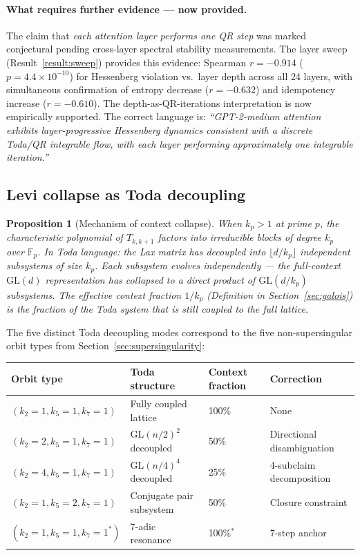\documentclass[11pt]{amsart}
\newtheorem{proposition}[theorem]{Proposition}
\theoremstyle{definition}
\begin{document}
\paragraph{What requires further evidence — now provided.}
The claim that \emph{each attention layer performs one QR step} was
marked conjectural pending cross-layer spectral stability measurements.
The layer sweep (Result~\ref{result:sweep}) provides this evidence:
Spearman $r = -0.914$ ($p = 4.4\times10^{-10}$) for Hessenberg violation
vs.\ layer depth across all 24 layers, with simultaneous confirmation of
entropy decrease ($r=-0.632$) and idempotency increase ($r=-0.610$).
The depth-as-QR-iterations interpretation is now empirically supported.
The correct language is: \emph{``GPT-2-medium attention exhibits
layer-progressive Hessenberg dynamics consistent with a discrete
Toda/QR integrable flow, with each layer performing approximately
one integrable iteration.''}

\subsection{Levi collapse as Toda decoupling}

\begin{proposition}[Mechanism of context collapse]
When $k_p > 1$ at prime $p$, the characteristic polynomial of
$T_{k,k+1}$ factors into irreducible blocks of degree $k_p$
over $\mathbb{F}_p$.
In Toda language: the Lax matrix has decoupled into
$\lfloor d/k_p \rfloor$ independent subsystems of size $k_p$.
Each subsystem evolves independently --- the full-context $\mathrm{GL}(d)$
representation has collapsed to a direct product of
$\mathrm{GL}(d/k_p)$ subsystems.
The effective context fraction $1/k_p$ (Definition in Section~\ref{sec:galois})
is the fraction of the Toda system that is still coupled to the full lattice.
\end{proposition}

The five distinct Toda decoupling modes correspond to the
five non-supersingular orbit types from Section~\ref{sec:supersingularity}:

\begin{center}
\renewcommand{\arraystretch}{1.2}
\begin{tabular}{@{}llll@{}}
\toprule
Orbit type & Toda structure & Context fraction & Correction \\
\midrule
$(k_2=1,k_5=1,k_7=1)$ & Fully coupled lattice & 100\% & None \\
$(k_2=2,k_5=1,k_7=1)$ & $\mathrm{GL}(n/2)^2$ decoupled & 50\% & Directional disambiguation \\
$(k_2=4,k_5=1,k_7=1)$ & $\mathrm{GL}(n/4)^4$ decoupled & 25\% & 4-subclaim decomposition \\
$(k_2=1,k_5=2,k_7=1)$ & Conjugate pair subsystem & 50\% & Closure constraint \\
$(k_2=1,k_5=1,k_7=1^*)$ & 7-adic resonance & 100\%$^*$ & 7-step anchor \\
\bottomrule
\end{tabular}
\end{center}
\end{document}
